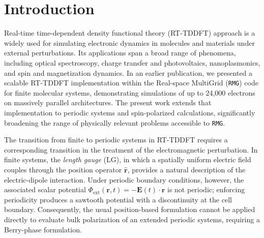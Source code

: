 
\section{Introduction}
\label{sec:intro}

Real-time time-dependent density functional theory (RT-TDDFT) approach is a widely 
used for simulating electronic dynamics in molecules and materials 
under external perturbations.\cite{tddft-fundamentals,chem-rev-Li,Ullrich-2025-perspective}
Its applications span a broad range of phenomena, including optical
spectroscopy,\cite{lopata-2011,raman-govind-2013,Yabana-dichrosim-2011,Rubio-angular-2017,xray-herbert-2023}
charge transfer and photovoltaics,\cite{review-photovoltaics,chem-rev-Li,lvn-ct-2012}
nanoplasmonics,\cite{LSPR-review,wong-plasmonic-antennas-2017,tao-2021}
and spin and magnetization
dynamics.\cite{spin-rt-tddft-Li-2014,spin-rt-tddft-Li-2016,LvN-spin-Hod-Scuseria-2015}
In an earlier publication, we presented a scalable RT-TDDFT
implementation within the Real-space MultiGrid (\texttt{RMG}) code
for finite molecular systems, demonstrating simulations of up to
24,000 electrons on massively parallel
architectures.\cite{jakowski-rmg-tddft-2025}
The present work extends that implementation to periodic systems and
spin-polarized calculations, significantly broadening the range of
physically relevant problems accessible to \texttt{RMG}.

The transition from finite to periodic systems in RT-TDDFT requires
a corresponding transition in the treatment of the electromagnetic
perturbation.
In finite systems, the \emph{length gauge} (LG), in which a spatially uniform electric 
field couples through the position operator $\hat{\mathbf r}$, provides 
a natural description of the electric-dipole interaction. Under periodic 
boundary conditions, however, the associated scalar potential 
$\Phi_{\mathrm{ext}}(\mathbf r,t)=-\mathbf E(t)\cdot\mathbf r$ is not periodic;
enforcing periodicity produces a sawtooth potential with a discontinuity 
at the cell boundary.\cite{Luber-2023-position-operator}
Consequently, the usual position-based formulation cannot be applied directly 
to evaluate bulk polarization of an extended periodic systems, requiring 
a Berry-phase formulation.\cite{Resta-polarization-1994,KingSmith-Vanderbilt-polarization-1993}

